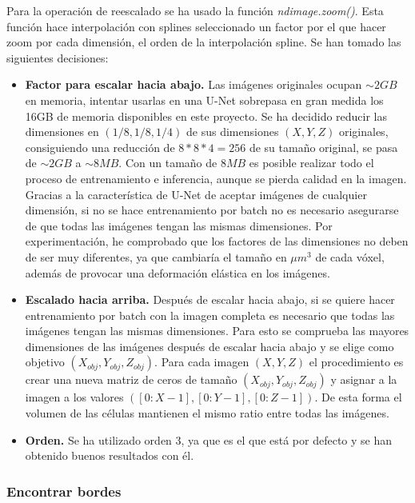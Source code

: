 Para la operación de reescalado se ha usado la función \textit{ndimage.zoom()}. Esta función hace interpolación con splines seleccionado un factor por el que hacer zoom por cada dimensión, el orden de la interpolación spline. Se han tomado las siguientes decisiones:
\begin{itemize}
\item \textbf{Factor para escalar hacia abajo.} Las imágenes originales ocupan $\sim 2GB$ en memoria, intentar usarlas en una U-Net sobrepasa en gran medida los 16GB de memoria disponibles en este proyecto. Se ha decidido reducir las dimensiones en $(1/8, 1/8, 1/4)$ de sus dimensiones $(X, Y, Z)$ originales, consiguiendo una reducción de $8*8*4=256$ de su tamaño original, se pasa de $\sim 2GB$ a $\sim 8MB$. Con un tamaño de $8MB$ es posible realizar todo el proceso de entrenamiento e inferencia, aunque se pierda calidad en la imagen. Gracias a la característica de U-Net de aceptar imágenes de cualquier dimensión, si no se hace entrenamiento por batch no es necesario asegurarse de que todas las imágenes tengan las mismas dimensiones. Por experimentación, he comprobado que los factores de las dimensiones no deben de ser muy diferentes, ya que cambiaría el tamaño en $\mu m^3$ de cada vóxel, además de provocar una deformación elástica en los imágenes.
\item \textbf{Escalado hacia arriba.} Después de escalar hacia abajo, si se quiere hacer entrenamiento por batch con la imagen completa es necesario que todas las imágenes tengan las mismas dimensiones. Para esto se comprueba las mayores dimensiones de las imágenes después de escalar hacia abajo y se elige como objetivo $(X_{obj}, Y_{obj}, Z_{obj})$. Para cada imagen $(X, Y, Z)$ el procedimiento es crear una nueva matriz de ceros de tamaño $(X_{obj}, Y_{obj}, Z_{obj})$ y asignar a la imagen a los valores $([0:X-1],[0:Y-1],[0:Z-1])$. De esta forma el volumen de las células mantienen el mismo ratio entre todas las imágenes.
\item \textbf{Orden.} Se ha utilizado orden 3, ya que es el que está por defecto y se han obtenido buenos resultados con él.
\end{itemize}

\subsubsection{Encontrar bordes}

